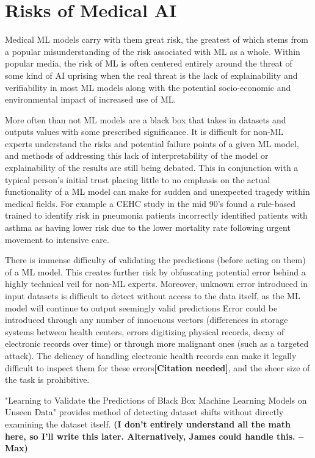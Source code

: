 \documentclass[]{article}
\begin{document}
	\section{Risks of Medical AI}
		Medical ML models carry with them great risk, the greatest of which stems from a popular misunderstanding of the risk associated with ML as a whole. Within popular media, the risk of ML is often centered entirely around the threat of some kind of AI uprising when the real threat is the lack of explainability and verifiability in most ML models along with the potential socio-economic and environmental impact of increased use of ML.\cite{bbc2016rroai,emerj2019roawrtiwwa}

		More often than not ML models are a black box that takes in datasets and outputs values with some prescribed significance. It is difficult for non-ML experts understand the risks and potential failure points of a given ML model, and methods of addressing this lack of interpretability of the model or explainability of the results are still being debated.\cite{10.1145/2858036.2858529, 10.1145/3328519.3329126} This in conjunction with a typical person's initial trust placing little to no emphasis on the actual functionality of a ML model\cite{siau2018building} can make for sudden and unexpected tragedy within medical fields. For example a CEHC study in the mid 90's found a rule-based trained to identify risk in pneumonia patients incorrectly identified patients with asthma as having lower risk due to the lower mortality rate following urgent movement to intensive care.\cite{caruana2015intelligible}

		There is immense difficulty of validating the predictions (before acting on them) of a ML model. This creates further risk by obfuscating potential error behind a highly technical veil for non-ML experts. Moreover, unknown error introduced in input datasets is difficult to detect without access to the data itself, as the ML model will continue to output seemingly valid predictions\cite{10.1145/3328519.3329126} Error could be introduced through any number of innocuous vectors (differences in storage systems between health centers, errors digitizing physical records, decay of electronic records over time) or through more malignant ones (such as a targeted attack). The delicacy of handling electronic health records can make it legally difficult to inspect them for these errors\textbf{[Citation needed]}, and the sheer size of the task is prohibitive.

		"Learning to Validate the Predictions of Black Box Machine Learning Models on Unseen Data"\cite{10.1145/3328519.3329126} provides method of detecting dataset shifts without directly examining the dataset itself. \textbf{(I don't entirely understand all the math here, so I'll write this later. Alternatively, James could handle this. --Max)}
\end{document}

